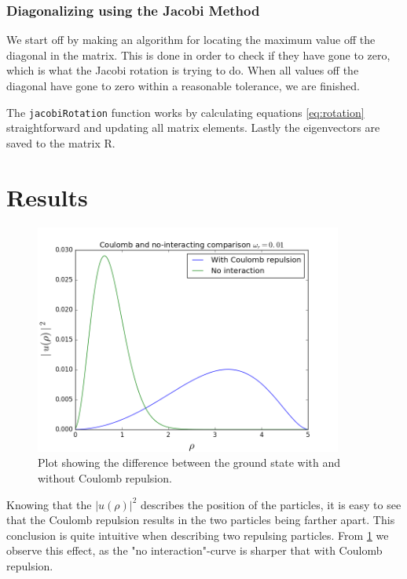 \documentclass[10pt, a4paper]{amsart}
\begin{document}
\subsubsection{Diagonalizing using the Jacobi Method} We start off by making an algorithm for locating the maximum value off the diagonal in the matrix. This is done in order to check if they have gone to zero, which is what the Jacobi rotation is trying to do. When all values off the diagonal have gone to zero within a reasonable tolerance, we are finished. 

The \texttt{jacobiRotation} function works by calculating equations \ref{eq:rotation} straightforward and updating all matrix elements. Lastly the eigenvectors are saved to the matrix R.

\section{Results}

\begin{figure}[ht]
	\label{fig:ConoCo}
	\centering
	\includegraphics[width=0.9\textwidth]{../figures/interaction.png}
	\caption{Plot showing the difference between the ground state with and without Coulomb repulsion.}
\end{figure}

Knowing that the $|u(\rho)|^2$ describes the position of the particles, it is easy to see that the Coulomb repulsion results in the two particles being farther apart. This conclusion is quite intuitive when describing two repulsing particles. From \ref{fig:ConoCo} we observe this effect, as the "no interaction"-curve is sharper that with Coulomb repulsion.
\end{document}
